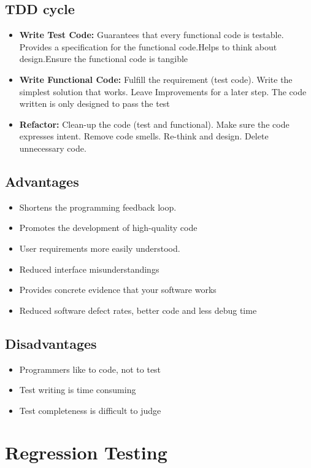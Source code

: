 \documentclass{article}
\begin{document}
\subsection{TDD cycle}
\begin{itemize}
\item \textbf{Write Test Code:} Guarantees that every functional code is testable. Provides a specification for the functional code.Helps to think about design.Ensure the functional code is tangible
\item \textbf{Write Functional Code:}  Fulfill the requirement (test code). Write the simplest solution that works. Leave Improvements for a later step. The code written is only designed to pass the test

\item \textbf{Refactor:} Clean-up the code (test and functional). Make sure the code expresses intent. Remove code smells. Re-think and design. Delete unnecessary code.
\end{itemize}


\subsection{Advantages}
\begin{itemize}
 \item  Shortens the programming feedback loop.
  \item Promotes the development of high-quality
code
  \item User requirements more easily understood.
  \item  Reduced interface misunderstandings
   \item   Provides concrete evidence that your
software works
\item Reduced software defect rates, better code and less debug time
\end{itemize}

\subsection{Disadvantages}
\begin{itemize}
 \item  Programmers like to code, not to test
  \item Test writing is time consuming
  \item  Test completeness is difficult to judge
\end{itemize}

\section{Regression Testing}
\end{document}
